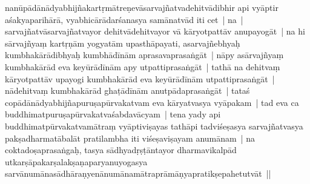 \documentclass[article,12pt,a4paper]{memoir}%
\newcounter{parCount}
\begin{document}
	{}
	\pend%
      

	  
	  \pstart \leavevmode%
	\label{thakur75-34.17}nanūpādānādyabhijñakartṛmātreṇevāsarvajñatvadehitvādibhir api vyāptir aśakyaparihārā, vyabhicārādarśanasya samānatvād iti cet | na | sarvajñatvāsarvajñatvayor dehitvādehitvayor vā kāryotpattāv anupayogāt | na hi sārvajñyaṃ kartṛṇām yogyatām upasthāpayati, asarvajñebhyaḥ kumbhakārādibhyaḥ kumbhādīnām aprasavaprasaṅgāt | nāpy asārvajñyaṃ kumbhakārād eva keyūrādīnām apy utpattiprasaṅgāt | tathā na dehitvaṃ kāryotpattāv upayogi kumbhakārād eva keyūrādīnām utpattiprasaṅgāt | nādehitvaṃ kumbhakārād ghaṭādīnām anutpādaprasaṅgāt | tataś copādānādyabhijñapuruṣapūrvakatvam eva kāryatvasya vyāpakam | tad eva ca buddhimatpuruṣapūrvakatvaśabdavācyam | \label{sarit__ratnakīrtinibandhāvali__88081}tena yady api buddhimatpūrvakatvamātraṃ vyāptiviṣayas tathāpi tadviśeṣasya sarvajñatvasya pakṣadharmatābalāt pratilambha iti viśeṣaviṣayam anumānam | na coktadoṣaprasaṅgaḥ, tasya sādhyadṛṣṭāntayor dharmavikalpād utkarṣāpakarṣalakṣaṇaparyanuyogasya sarvānumānasādhāraṇyenānumānamātraprāmāṇyapratikṣepahetutvāt ||\label{sarit__ratnakīrtinibandhāvali__88447}
	{}
	\pend%
      
\end{document}
